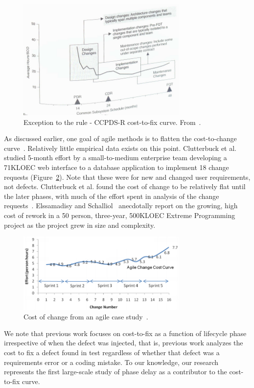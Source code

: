 \begin{figure}[!ht]
 \includegraphics[width=3.3in]{Royce98.PNG}
 \caption{Exception to the rule - CCPDS-R cost-to-fix curve. From~\cite{Royce98}. }\label{fig:royce}
 \end{figure}
 
As discussed earlier, one goal of agile methods is to flatten the cost-to-change curve~\cite{beck00}. Relatively little empirical data exists on this point. Clutterbuck et al.~\cite{Clutterbuck09} studied 5-month effort by a small-to-medium enterprise team developing a 71KLOEC web interface to a database application to implement 18 change requests (Figure~\ref{fig:clutterbuck}). Note that these were for new and changed user requirements, not defects. Clutterbuck et al. found the cost of change to be relatively flat until the later phases, with much of the effort spent in analysis of the change requests~\cite{Clutterbuck09}. Elssamadisy and Schalliol~\cite{Elssamadisy02} anecdotally report on the growing, high cost of rework in a 50 person, three-year, 500KLOEC Extreme Programming project as the project grew in size and complexity.

\begin{figure}[!ht]
 \includegraphics[width=3.3in]{clutterbuck.png}
 \caption{Cost of change from an agile case study~\cite{Clutterbuck09}.}\label{fig:clutterbuck}
 \end{figure}
 
 We note that previous work focuses on cost-to-fix as a function of lifecycle phase irrespective of when the defect was injected, that is, previous work analyzes the cost to fix a defect found in test regardless of whether that defect was a requirements error or a coding mistake. To our knowledge, our research represents the first large-scale study of phase delay as a contributor to the cost-to-fix curve.